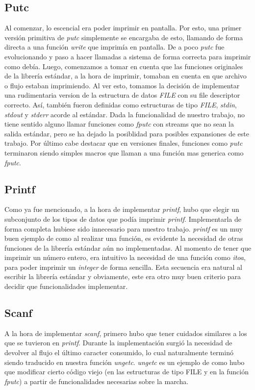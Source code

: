 \documentclass[a4paper,10pt]{article}
\begin{document}
    \subsection{Putc}
        Al comenzar, lo escencial era poder imprimir en pantalla. Por esto, una primer versión primitiva de \textit{putc} simplemente se encargaba de esto, llamando de forma directa a una función \textit{write} que imprimía en pantalla. De a poco \textit{putc} fue evolucionando y paso a hacer llamadas a sistema de forma correcta para imprimir como debía.
        Luego, comenzamos a tomar en cuenta que las funciones originales de la librería estándar, a la hora de imprimir, tomaban en cuenta en que archivo o flujo estaban imprimiendo. Al ver esto, tomamos la decisión de implementar una rudimentaria version de la estructura de datos \textit{FILE} con su file descriptor correcto. Así, también fueron definidas como estructuras de tipo \textit{FILE}, \textit{stdin}, \textit{stdout} y \textit{stderr} acorde al estándar. Dada la funcionalidad de nuestro trabajo, no tiene sentido alguno llamar funciones como \textit{fputc} con streams que no sean la salida estándar, pero se ha dejado la posiblidad para posibles expansiones de este trabajo.
        Por último cabe destacar que en versiones finales, funciones como \textit{putc} terminaron siendo simples macros que llaman a una función mas generica como \textit{fputc}.

    \subsection{Printf}
        Como ya fue mencionado, a la hora de implementar \textit{printf}, hubo que elegir un subconjunto de los tipos de datos que podía imprimir \textit{printf}. Implementarla de forma completa hubiese sido innecesario para nuestro trabajo. \textit{printf} es un muy buen ejemplo de como al realizar una función, es evidente la necesidad de otras funciones de la librería estándar aún no implementadas. Al momento de tener que imprimir un número entero, era intuitivo la necesidad de una función como \textit{itoa}, para poder imprimir un \textit{integer} de forma sencilla. Esta secuencia era natural al escribir la librería estándar y obviamente, este era otro muy buen criterio para decidir que funcionalidades implementar.

    \subsection{Scanf}    
        A la hora de implementar \textit{scanf}, primero hubo que tener cuidados similares a los que se tuvieron en \textit{printf}. Durante la implementación surgió la necesidad de devolver al flujo el último caracter consumido, lo cual naturalmente terminó siendo traducido en nuestra función \textit{ungetc}. \textit{ungetc} es un ejemplo de como hubo que modificar cierto código viejo (en las estructuras de tipo FILE y en la función \textit{fputc}) a partir de funcionalidades necesarias sobre la marcha.
\newpage
\end{document}
